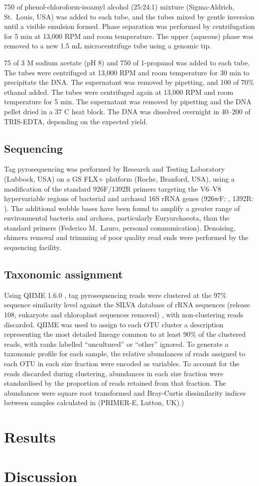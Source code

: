 750 \microlitre{} of phenol-chloroform-isoamyl alcohol (25:24:1) mixture (Sigma-Aldrich, St.\ Louis, USA) was added to each tube, and the tubes mixed by gentle inversion until a visible emulsion formed.
Phase separation was performed by centrifugation for 5 min at 13,000 RPM and room temperature.
The upper (aqueous) phase was removed to a new 1.5 mL microcentrifuge tube using a genomic tip.

75 \microlitre{} of 3 M sodium acetate (pH 8) and 750 \microlitre{} of 1-propanol was added to each tube.
The tubes were centrifuged at 13,000 RPM and room temperature for 30 min to precipitate the DNA.
The supernatant was removed by pipetting, and 100 \microlitre{} of 70\% ethanol added.
The tubes were centrifuged again at 13,000 RPM and room temperature for 5 min.
The supernatant was removed by pipetting and the DNA pellet dried in a 37 \textdegree{}C heat block.
The DNA was dissolved overnight in 40--200 \microlitre{} of TRIS-EDTA, depending on the expected yield.

\subsection{Sequencing}

Tag pyrosequencing was performed by Research and Testing Laboratory (Lubbock, USA) on a GS FLX+ platform (Roche, Branford, USA), using a modification of the standard 926F/1392R primers targeting the V6--V8 hypervariable regions of bacterial and archaeal 16S rRNA genes (926wF: , 1392R: ).
The additional wobble bases have been found to amplify a greater range of environmental bacteria and archaea, particularly Euryarchaeota, than the standard primers (Federico M.\ Lauro, personal communication).
Denoising, chimera removal and trimming of poor quality read ends were performed by the sequencing facility.

\subsection{Taxonomic assignment}

Using \ac{QIIME} 1.6.0 \cite{Caporaso:2010ts}, tag pyrosequencing reads were clustered at the 97\% sequence similarity level against the SILVA database of rRNA sequences (release 108, eukaryote and chloroplast sequences removed) \cite{Quast:2013hk}, with non-clustering reads discarded.
\ac{QIIME} was used to assign to each \ac{OTU} cluster a description representing the most detailed lineage common to at least 90\% of the clustered reads, with ranks labelled ``uncultured'' or ``other'' ignored.
To generate a taxonomic profile for each sample, the relative abundances of reads assigned to each \ac{OTU} in each size fraction were encoded as variables.
To account for the reads discarded during clustering, abundances in each size fraction were standardised by the proportion of reads retained from that fraction.
The abundances were square root transformed and Bray-Curtis dissimilarity indices between samples calculated in  (PRIMER-E, Lutton, UK).)

\section{Results}

\section{Discussion}
